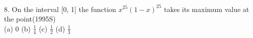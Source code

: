 \documentclass[journal,12pt,twocolumn]{IEEEtran}
\theoremstyle{remark}
\begin{document}
8.  On the interval [0, 1] the function $x^{25}(1-x)^{25}$ \indent takes its maximum value at the point\hspace{0.7cm}(1995S)\\[2pt]\indent (a)\hspace{0.2cm} 0\hspace{0.9cm} (b)\hspace{0.2cm} $\displaystyle\frac{1}{4}$\hspace{0.9cm} (c)\hspace{0.2cm} $\displaystyle\frac{1}{2}$\hspace{0.9cm} (d)\hspace{0.2cm} $\displaystyle\frac{1}{3}$
    
\newpage
\bigskip
\renewcommand{\thefigure}
{\theenumi}
\renewcommand{\thetable}
{\theenumi}
\end{document}
